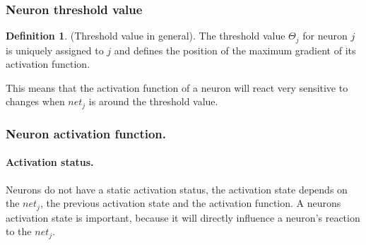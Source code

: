 \documentclass[pdftex,a4paper,12pt,twoside]{report}
\theoremstyle{plain} \newtheorem{theorem}{Theorem} \newtheorem{proposition}{Proposition} \newtheorem{lemma}{Lemma} \newtheorem*{corollary}{Corollary}
\theoremstyle{definition} \newtheorem{definition}{Definition} \newtheorem{conjecture}{Conjecture} \newtheorem*{example}{Example} \newtheorem{algorithm}{Algorithm}
\theoremstyle{remark} \newtheorem*{remark}{Remark} \newtheorem*{note}{Note} \newtheorem{case}{Case}
\begin{document}
\subsubsection{Neuron threshold value}
\begin{definition}
(Threshold value in general). The threshold value $\Theta_j$ for neuron $j$ is uniquely assigned to $j$ and defines the position of the maximum gradient of its activation function.
\end{definition}
This means that the activation function of a neuron will react very sensitive to changes when $net_j$ is around the threshold value. 
\subsubsection{Neuron activation function.}
\paragraph{Activation status.}Neurons do not have a static activation status, the activation state depends on the $net_j$, the previous activation state and the activation function. A neurons activation state is important, because it will directly influence a neuron's reaction to the $net_j$.
\end{document}
